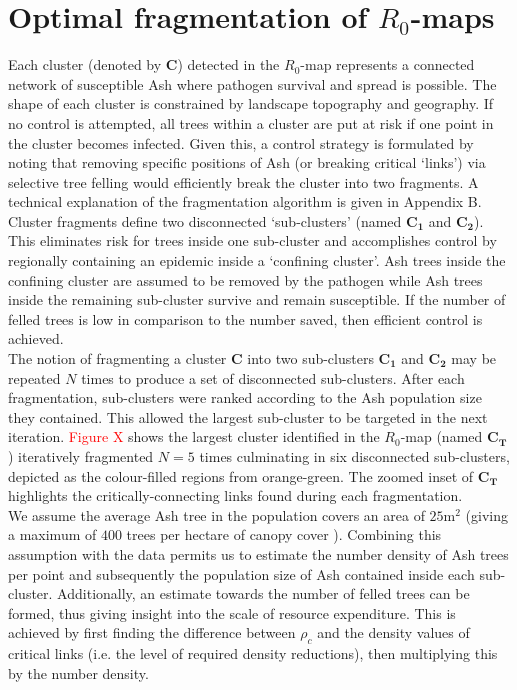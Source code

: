 \section{Optimal fragmentation of $R_0$-maps}

Each cluster (denoted by $\mathbf{C}$) detected in the $R_0$-map represents a connected network of susceptible Ash where pathogen survival and spread is possible. The shape of each cluster is constrained by landscape topography and geography. If no control is attempted, all trees within a cluster are put at risk if one point in the cluster becomes infected. Given this, a control strategy is formulated by noting that removing specific positions of Ash (or breaking critical `links') via selective tree felling would efficiently break the cluster into two fragments. A technical explanation of the fragmentation algorithm is given in Appendix B.\\

Cluster fragments define two disconnected `sub-clusters' (named $\mathbf{C_1}$ and $\mathbf{C_2}$). This eliminates risk for trees inside one sub-cluster and accomplishes control by regionally containing an epidemic inside a `confining cluster'. Ash trees inside the confining cluster are assumed to be removed by the pathogen while Ash trees inside the remaining sub-cluster survive and remain susceptible. If the number of felled trees is low in comparison to the number saved, then efficient control is achieved.\\

The notion of fragmenting a cluster $\mathbf{C}$ into two sub-clusters $\mathbf{C_1}$ and $\mathbf{C_2}$ may be repeated $N$ times to produce a set of disconnected sub-clusters. After each fragmentation, sub-clusters were ranked according to the Ash population size they contained. This allowed the largest sub-cluster to be targeted in the next iteration. \textcolor{red}{Figure X} shows the largest cluster identified in the $R_0$-map (named $\mathbf{C_T}$) iteratively fragmented $N=5$ times culminating in six disconnected sub-clusters, depicted as the colour-filled regions from orange-green. The zoomed inset of $\mathbf{C_T}$ highlights the critically-connecting links found during each fragmentation.\\


We assume the average Ash tree in the population covers an area of $\mathrm{25m^2}$ (giving a maximum of $400$ trees per hectare of canopy cover \cite{ash-tree2, ash-tree1}). Combining this assumption with the data permits us to estimate the number density of Ash trees per point and subsequently the population size of Ash contained inside each sub-cluster. Additionally, an estimate towards the number of felled trees can be formed, thus giving insight into the scale of resource expenditure. This is achieved by first finding the difference between $\rho_c$ and the density values of critical links (i.e. the level of required density reductions), then multiplying this by the number density.\\

